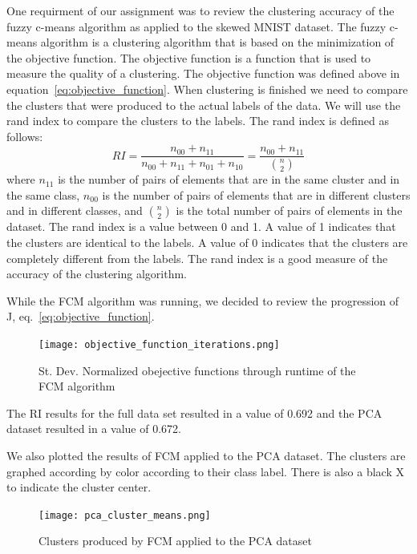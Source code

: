 One requirment of our assignment was to review the clustering accuracy of the fuzzy c-means algorithm as applied to the skewed MNIST dataset.
The fuzzy c-means algorithm is a clustering algorithm that is based on the minimization of the objective function. 
The objective function is a function that is used to measure the quality of a clustering. The objective function was defined above in equation~\ref{eq:objective_function}.
When clustering is finished we need to compare the clusters that were produced to the actual labels of the data. We will use the rand index to compare the clusters to the labels. The rand index is defined as follows:
\begin{equation}
\label{eq:rand_index}
RI = \frac{n_{00} + n_{11}}{n_{00} + n_{11} +n_{01} + n_{10}} = \frac{n_{00} + n_{11}}{{n \choose 2}}
\end{equation}
where $n_{11}$ is the number of pairs of elements that are in the same cluster and in the same class, $n_{00}$ is the number of pairs of elements that are in different clusters and in different classes, and ${n} \choose {2}$ is the total number of pairs of elements in the dataset. 
The rand index is a value between 0 and 1. 
A value of 1 indicates that the clusters are identical to the labels.
A value of 0 indicates that the clusters are completely different from the labels. 
The rand index is a good measure of the accuracy of the clustering algorithm. 

While the FCM algorithm was running, we decided to review the progression of J, eq.~\ref{eq:objective_function}.

\begin{figure}[H]
    \centering
    \texttt{[image: objective\_function\_iterations.png]}
    \caption{St. Dev. Normalized obejective functions through runtime of the FCM algorithm}
    \label{fig:objective_function_iterations}    
\end{figure}

The RI results for the full data set resulted in a value of 0.692 and the PCA dataset resulted in a value of 0.672.

We also plotted the results of FCM applied to the PCA dataset. The clusters are graphed according by color according to their class label. 
There is also a black X to indicate the cluster center.

\begin{figure}[H]
    \centering
    \texttt{[image: pca\_cluster\_means.png]}
    \caption{Clusters produced by FCM applied to the PCA dataset}
    \label{fig:pca_clusters}
\end{figure}

